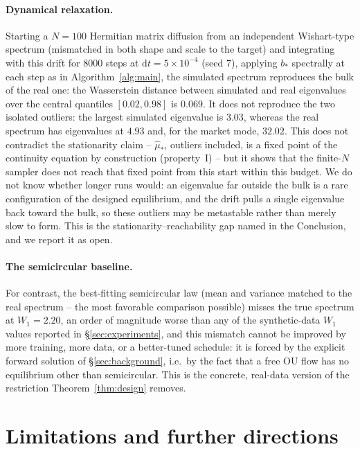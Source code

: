 \documentclass[11pt]{article}
\newcommand{\dd}{\mathrm{d}}
\theoremstyle{plain}
\theoremstyle{definition}
\theoremstyle{remark}
\begin{document}
\paragraph{Dynamical relaxation.} Starting a $N=100$
Hermitian matrix diffusion from an independent Wishart-type spectrum (mismatched in both
shape and scale to the target) and integrating with this drift for $8000$ steps at
$\dd t=5\times10^{-4}$ (seed $7$), applying $b_*$ spectrally at each step as in
Algorithm~\ref{alg:main}, the simulated spectrum reproduces the bulk of the real one: the
Wasserstein distance between simulated and real eigenvalues over the central quantiles
$[0.02,0.98]$ is $0.069$. It does not reproduce the two isolated outliers: the largest
simulated eigenvalue is $3.03$, whereas the real spectrum has eigenvalues at $4.93$ and,
for the market mode, $32.02$. This does not contradict the stationarity claim --
$\hat\mu_*$, outliers included, is a fixed point of the continuity equation by construction
(property~I) -- but it shows that the finite-$N$ sampler does not reach that fixed point from
this start within this budget. We do not know whether longer runs would: an eigenvalue far
outside the bulk is a rare configuration of the designed equilibrium, and the drift pulls
a single eigenvalue back toward the bulk, so these outliers may be metastable rather than
merely slow to form. This is the stationarity--reachability gap named in the Conclusion,
and we report it as open.

\paragraph{The semicircular baseline.} For contrast, the best-fitting semicircular
law (mean and variance matched to the real spectrum -- the most favorable comparison
possible) misses the true spectrum at $W_1=2.20$, an order of magnitude worse than
any of the synthetic-data $W_1$ values reported in \S\ref{sec:experiments}, and this
mismatch cannot be improved by more training, more data, or a better-tuned schedule:
it is forced by the explicit forward solution of \S\ref{sec:background}, i.e.\ by the
fact that a free OU flow has no equilibrium other than
semicircular. This
is the concrete, real-data version of the restriction Theorem~\ref{thm:design}
removes.

\section{Limitations and further directions}\label{app:limitations}
\end{document}

